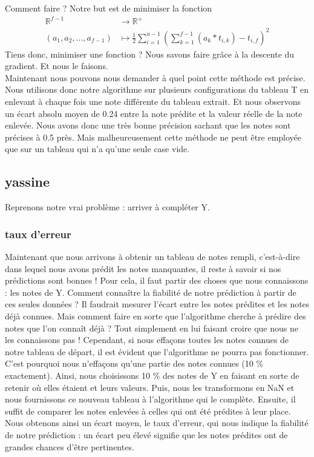 \documentclass[a4paper,10pt]{article}
\begin{document}
Comment faire ? Notre but est de minimiser la fonction
\begin{align*}
\mathbb{R}^{f-1}&\longrightarrow \mathbb{R}^+\\ 
(a_1, a_2, ..., a_{f-1})&\longmapsto \frac{1}{2}\sum_{i = 1}^{u - 1} (\sum_{k = 1}^{f-1} (a_k * t_{i, k}) - t_{i, f})^2
\end{align*}
Tiens donc, minimiser une fonction ? Nous savons faire grâce à la descente du gradient. Et nous le faisons.\\

Maintenant nous pouvons nous demander à quel point cette méthode est précise. Nous utilisons donc notre algorithme sur plusieurs configurations du tableau T en enlevant à chaque fois une note différente du tableau extrait. Et nous observons un écart absolu moyen de 0.24 entre la note prédite et la valeur réelle de la note enlevée. Nous avons donc une très bonne précision sachant que les notes sont précises à 0.5 près. Mais malheureusement cette méthode ne peut être employée que sur un tableau qui n'a qu'une seule case vide.

\subsection{yassine}

Reprenons notre vrai problème : arriver à compléter Y.

\subsubsection{taux d'erreur}
Maintenant que nous arrivons à obtenir un tableau de notes rempli, c'est-à-dire dans lequel nous avons prédit les notes manquantes, il reste à savoir si nos prédictions sont bonnes !
Pour cela, il faut partir des choses que nous connaissons : les notes de Y. 
Comment connaître la fiabilité de notre prédiction à partir de ces seules données ?  
Il faudrait mesurer l'écart entre les notes prédites et les notes déjà connues.
Mais comment faire en sorte que l'algorithme cherche à prédire des notes que l'on connaît déjà ?
Tout simplement en lui faisant croire que nous ne les connaissons pas !
Cependant, si nous effaçons toutes les notes connues de notre tableau de départ, il est évident que l'algorithme ne pourra pas fonctionner.
C'est pourquoi nous n'effaçons qu'une partie des notes connues (10 \% exactement). 
Ainsi, nous choisissons 10 \% des notes de Y en faisant en sorte de retenir où elles étaient et leurs valeurs. 
Puis, nous les transformons en NaN et nous fournissons ce nouveau tableau à l'algorithme qui le complète. 
Ensuite, il suffit de comparer les notes enlevées à celles qui ont été prédites à leur place. 
Nous obtenons ainsi un écart moyen, le taux d'erreur, qui nous indique la fiabilité de notre prédiction : 
un écart peu élevé signifie que les notes prédites ont de grandes chances d'être pertinentes.
\end{document}
